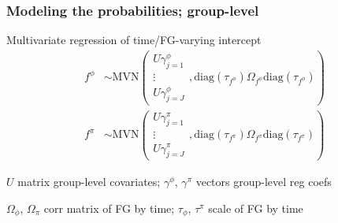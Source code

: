 \documentclass{beamer}
\begin{document}
\begin{frame}
  \frametitle{Modeling the probabilities; group-level}
  \begin{block}{Multivariate regression of time/FG-varying intercept}
    \setlength\abovedisplayskip{-0.3cm}
    \begin{align*}
      f^{\phi} &\sim \text{MVN}\left(
      \begin{matrix}
        U \gamma^{\phi}_{j = 1} \\
        \vdots \\
        U \gamma^{\phi}_{j = J}
      \end{matrix}, 
      \text{diag}(\tau_{f^{\phi}}) \Omega_{f^{\phi}} \text{diag}(\tau_{f^{\phi}}) \right) \\
      f^{\pi} &\sim \text{MVN}\left(
      \begin{matrix}
        U \gamma^{\pi}_{j = 1} \\
        \vdots \\
        U \gamma^{\pi}_{j = J}
      \end{matrix}, 
      \text{diag}(\tau_{f^{\pi}}) \Omega_{f^{\pi}} \text{diag}(\tau_{f^{\pi}}) \right)
    \end{align*}
    \begin{scriptsize}
      \(U\) matrix group-level covariates; \(\gamma^{\phi}\), \(\gamma^{\pi}\) vectors group-level reg coefs

      \(\Omega_{\phi}\), \(\Omega_{\pi}\) corr matrix of FG by time; \(\tau_{\phi}\), \(\tau^{\pi}\) scale of FG by time
    \end{scriptsize}
  \end{block}
\end{frame}
\end{document}
